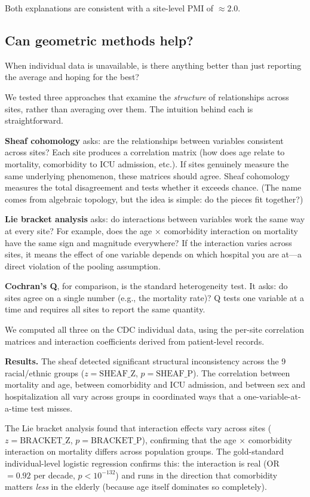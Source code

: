 \documentclass{article}
\begin{document}
Both explanations are consistent with a site-level PMI of $\approx 2.0$.


\subsection{Can geometric methods help?}

When individual data is unavailable, is there anything better than
just reporting the average and hoping for the best?

We tested three approaches that examine the \emph{structure} of relationships
across sites, rather than averaging over them.  The intuition behind each is
straightforward.

\textbf{Sheaf cohomology} asks: are the relationships between variables
consistent across sites?  Each site produces a correlation matrix (how does
age relate to mortality, comorbidity to ICU admission, etc.).  If sites
genuinely measure the same underlying phenomenon, these matrices should agree.
Sheaf cohomology measures the total disagreement and tests whether it exceeds
chance.  (The name comes from algebraic topology, but the idea is simple: do
the pieces fit together?)

\textbf{Lie bracket analysis} asks: do interactions between variables work the
same way at every site?  For example, does the age $\times$ comorbidity
interaction on mortality have the same sign and magnitude everywhere?  If the
interaction varies across sites, it means the effect of one variable depends
on which hospital you are at---a direct violation of the pooling assumption.

\textbf{Cochran's Q}, for comparison, is the standard heterogeneity test.  It
asks: do sites agree on a single number (e.g., the mortality rate)?  Q tests
one variable at a time and requires all sites to report the same quantity.

We computed all three on the CDC individual data, using the per-site
correlation matrices and interaction coefficients derived from patient-level
records.

\textbf{Results.}  The sheaf detected significant structural inconsistency
across the 9 racial/ethnic groups ($z = \text{SHEAF\_Z}$, $p =
\text{SHEAF\_P}$).  The correlation between mortality and age, between
comorbidity and ICU admission, and between sex and hospitalization all vary
across groups in coordinated ways that a one-variable-at-a-time test misses.

The Lie bracket analysis found that interaction effects vary across sites ($z
= \text{BRACKET\_Z}$, $p = \text{BRACKET\_P}$), confirming that the
age $\times$ comorbidity interaction on mortality differs across population
groups.  The gold-standard individual-level logistic regression confirms this:
the interaction is real (OR $= 0.92$ per decade, $p < 10^{-132}$) and runs
in the direction that comorbidity matters \emph{less} in the elderly (because
age itself dominates so completely).
\end{document}
